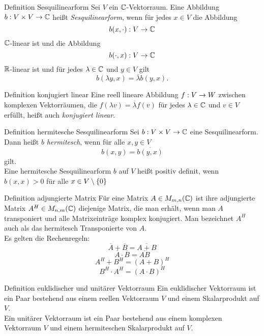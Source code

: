 \documentclass[main.tex]{subfiles}
\begin{document}
\begin{karte}{Definition Sesquilinearform}
    Sei \(V\) ein \(\mathbb{C}\)-Vektorraum. Eine Abbildung \(b : V\times V \rightarrow \mathbb{C}\)
    heißt \textit{Sesquilinearform}, wenn für jedes \(x\in V\) die Abbildung
    \[ b(x, \cdot) : V \rightarrow \mathbb{C} \]
    \(\mathbb{C}\)-linear ist und die Abbildung
    \[ b(\cdot, x) : V \rightarrow \mathbb{C} \]
    \(\mathbb{R}\)-linear ist und für jedes \(\lambda \in \mathbb{C}\) und \(y \in V\) gilt
    \[ b(\lambda y, x) = \overline{\lambda} b(y,x). \]
\end{karte}

\begin{karte}{Definition konjugiert linear}
    Eine reell lineare Abbildung \(f : V \rightarrow W\) zwischen komplexen Vektorräumen,
    die \(f(\lambda v) = \overline{\lambda}f(v)\) für jedes \(\lambda \in \mathbb{C}\)
    und \(v \in V\) erfüllt, heißt auch \textit{konjugiert linear}.
\end{karte}

\begin{karte}{Definition hermitesche Sesquilinearform}
    Sei \(b : V\times V \rightarrow \mathbb{C}\) eine Sesquilinearform. 
    Dann heißt \(b\) \textit{hermitesch},
    wenn für alle \(x,y \in V\)
    \[ b(x,y) = \overline{b(y,x)} \]
    gilt.\\
    Eine hermitesche Sesquilinearform \(b\) auf \(V\) heißt positiv definit,
    wenn \(b(x,x) > 0\) für alle \(x \in V \setminus \{0\}\)
\end{karte}

\begin{karte}{Definition adjungierte Matrix}
    Für eine Matrix \(A \in M_{m,n}(\mathbb{C})\) ist ihre 
    adjungierte Matrix \(A^H \in M_{n,m}(\mathbb{C})\)
    diejenige Matrix, die man erhält, wenn man 
    \(A\) transponiert und alle Matrixeinträge 
    komplex konjugiert. Man bezeichnet \(A^H\) 
    auch als das hermitesch Transponierte von \(A\).\\
    Es gelten die Rechenregeln:\\
    \[ \overline{A} + \overline{B} = \overline{A + B} \]
    \[ \overline{A} \cdot \overline{B} = \overline{AB} \]
    \[ A^H + B^H = (A + B)^H \]
    \[ B^H \cdot A^H = (A \cdot B)^H \]
\end{karte}

\begin{karte}{Definition euklidischer und unitärer Vektorraum}
    Ein euklidischer Vektorraum ist ein Paar bestehend aus einem reellen Vektorraum \(V\)
    und einem Skalarprodukt auf \(V\).\\
    Ein unitärer Vektorraum ist ein Paar bestehend aus einem komplexen Vektorraum \(V\) und
    einem hermiteschen Skalarprodukt auf \(V\).
\end{karte}
\end{document}
